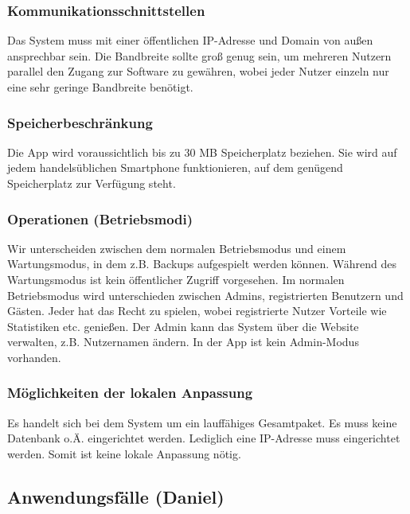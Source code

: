 \documentclass[fontsize=12pt,paper=a4,twoside]{scrartcl}
\begin{document}
\subsubsection{Kommunikationsschnittstellen}
  
Das System muss mit einer öffentlichen IP-Adresse und Domain von außen ansprechbar sein. Die Bandbreite sollte groß genug sein, um mehreren Nutzern parallel den Zugang zur Software zu gewähren, wobei jeder Nutzer einzeln nur eine sehr geringe Bandbreite benötigt.

\subsubsection{Speicherbeschränkung}


Die App wird voraussichtlich bis zu 30 MB Speicherplatz beziehen. Sie wird auf jedem handelsüblichen Smartphone funktionieren, auf dem genügend Speicherplatz zur Verfügung steht.


\subsubsection{Operationen (Betriebsmodi)}

Wir unterscheiden zwischen dem normalen Betriebsmodus und einem Wartungsmodus, in dem z.B. Backups aufgespielt werden können. Während des Wartungsmodus ist kein öffentlicher Zugriff vorgesehen. Im normalen Betriebsmodus wird unterschieden zwischen Admins, registrierten Benutzern und Gästen. Jeder hat das Recht zu spielen, wobei registrierte Nutzer Vorteile wie Statistiken etc. genießen. Der Admin kann das System über die Website verwalten, z.B. Nutzernamen ändern. In der App ist kein Admin-Modus vorhanden.

\subsubsection{Möglichkeiten der lokalen Anpassung}
  
Es handelt sich bei dem System um ein lauffähiges Gesamtpaket. Es muss keine Datenbank o.Ä. eingerichtet werden. Lediglich eine IP-Adresse muss eingerichtet werden. Somit ist keine lokale Anpassung nötig.

\subsection{Anwendungsfälle (Daniel)}
\end{document}

